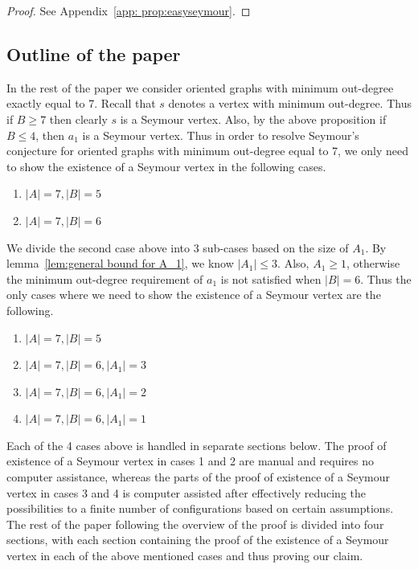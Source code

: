 \documentclass[a4paper,fleqn]{cas-sc}
\theoremstyle{definition}
\begin{document}
\begin{proof}
See Appendix~\ref{app: prop:easyseymour}.
\end{proof}

\subsection*{Outline of the paper}
In the rest of the paper we consider oriented graphs with minimum out-degree exactly equal to 7. Recall that $s$ denotes a vertex with minimum out-degree. Thus if $B\geq 7$ then clearly $s$ is a Seymour vertex. Also, by the above proposition if $B \leq 4$, then $a_1$ is a Seymour vertex. Thus in order to resolve Seymour's conjecture for oriented graphs with minimum out-degree equal to 7, we only need to show the existence of a Seymour vertex in the following cases.

\begin{enumerate}
    \item $|A|=7, |B|=5$
    \item $|A|=7, |B|=6$
\end{enumerate}

We divide the second case above into 3 sub-cases based on the size of $A_1$. By lemma~\ref{lem:general bound for A_1}, we know $|A_1| \leq 3$. Also, $A_1\geq 1$, otherwise the minimum out-degree requirement of $a_1$ is not satisfied when $|B|=6$. Thus the only cases where we need to show the existence of a Seymour vertex are the following.

\begin{enumerate}
    \item $|A|=7, |B|=5$
    \item $|A|=7, |B|=6, |A_1|=3$
    \item $|A|=7, |B|=6, |A_1|=2$
    \item $|A|=7, |B|=6, |A_1|=1$
\end{enumerate}

Each of the 4 cases above is handled in separate sections below. The proof of existence of a Seymour vertex in cases 1 and 2 are manual and requires no computer assistance, whereas the parts of the proof of existence of a Seymour vertex in cases 3 and 4 is computer assisted after effectively reducing the possibilities to a finite number of configurations based on certain assumptions. The rest of the paper following the overview of the proof is divided into four sections, with each section containing the proof of the existence of a Seymour vertex in each of the above mentioned cases and thus proving our claim.
\end{document}
